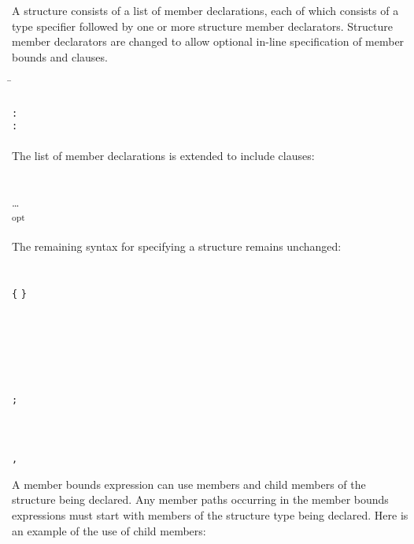 A structure consists of a list of member declarations, each of which
consists of a type specifier followed by one or more structure member
declarators. Structure member declarators are changed to allow 
optional in-line specification of member bounds and 
clauses.

\begin{tabbing}
\=\\
\>  \\
\>  \texttt{:}
    \\
\>  \texttt{:} 
 \\
\\
The list of member declarations is extended to include 
clauses:\\
\\
\\
\> \ldots{} \\
\> \textsubscript{opt}  \\
\\
The remaining syntax for specifying a structure remains unchanged: \\
\\
\\
\>  \texttt{\{}
 \texttt{\}} \\
\\
 \\
\>  \\
\>  \\
\\
 \\
\>  \texttt{;} \\
\\
 \\
\>  \\
\>  \texttt{,}  
\end{tabbing}

A member bounds expression can use members and child members of the
structure being declared. Any member paths occurring in the member
bounds expressions must start with members of the structure type being
declared. Here is an example of the use of child members:

